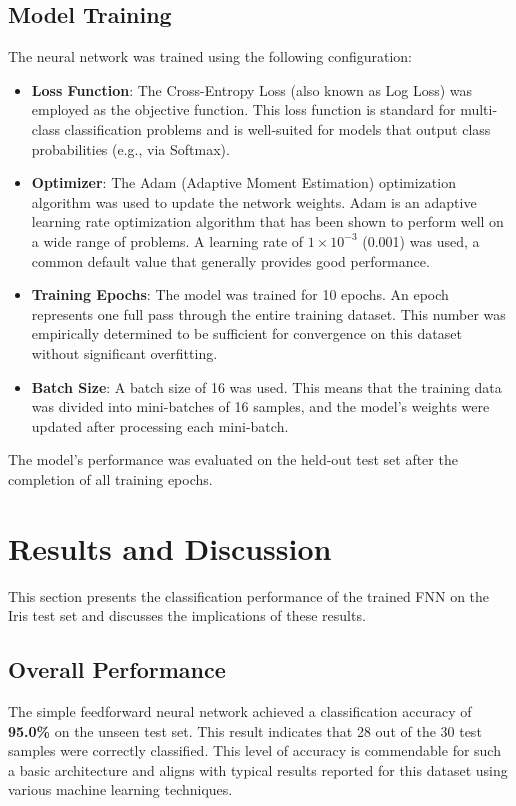 \documentclass[12pt,a4paper]{article}
\begin{document}
	\subsection{Model Training}
	The neural network was trained using the following configuration:
	\begin{itemize}
		\item \textbf{Loss Function}: The Cross-Entropy Loss (also known as Log Loss) was employed as the objective function. This loss function is standard for multi-class classification problems and is well-suited for models that output class probabilities (e.g., via Softmax).
		\item \textbf{Optimizer}: The Adam (Adaptive Moment Estimation) optimization algorithm \cite{AdamOptimizer} was used to update the network weights. Adam is an adaptive learning rate optimization algorithm that has been shown to perform well on a wide range of problems. A learning rate of \(1 \times 10^{-3}\) (0.001) was used, a common default value that generally provides good performance.
		\item \textbf{Training Epochs}: The model was trained for 10 epochs. An epoch represents one full pass through the entire training dataset. This number was empirically determined to be sufficient for convergence on this dataset without significant overfitting.
		\item \textbf{Batch Size}: A batch size of 16 was used. This means that the training data was divided into mini-batches of 16 samples, and the model's weights were updated after processing each mini-batch.
	\end{itemize}
	The model's performance was evaluated on the held-out test set after the completion of all training epochs.
	
	\section{Results and Discussion}
	This section presents the classification performance of the trained FNN on the Iris test set and discusses the implications of these results.
	
	\subsection{Overall Performance}
	The simple feedforward neural network achieved a classification accuracy of \textbf{95.0\%} on the unseen test set. This result indicates that 28 out of the 30 test samples were correctly classified. This level of accuracy is commendable for such a basic architecture and aligns with typical results reported for this dataset using various machine learning techniques.
	
\end{document}
